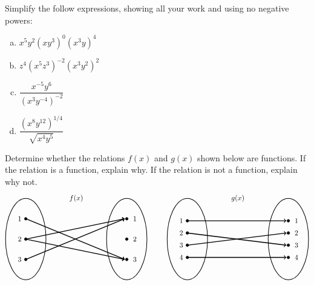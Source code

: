 \documentclass[11pt,letterpaper]{article}
\begin{document}
\prob Simplify the follow expressions, showing all your work and using no negative powers:
	\begin{enumerate}[(a)] \itemsep=0.3cm
	\item $x^5 y^2 (xy^3)^0 (x^3y)^4$
	\item $z^4(x^5 z^3)^{-2} (x^3 y^2)^2$
	\item $\dfrac{x^{-5} y^6}{(x^3 y^{-4})^{-2}}$
	\item $\dfrac{(x^8 y^{12})^{1/4}}{\sqrt{x^4 y^5}}$
	\end{enumerate} \pspace


\prob Determine whether the relations $f(x)$ and $g(x)$ shown below are functions. If the relation is a function, explain why. If the relation is not a function, explain why not. 
	\[
	\begin{tikzpicture}
	\node at (2.5,2) {$f(x)$};
	\draw[line width=0.03cm] (0,0) circle (1 and 2);
	\draw[line width=0.03cm] (5,0) circle (1 and 2);
	
	\draw[fill=black] (0,1) circle (0.07);
	\draw[fill=black] (0,0) circle (0.07);
	\draw[fill=black] (0,-1) circle (0.07);
	
	\draw[fill=black] (5,1) circle (0.07);
	\draw[fill=black] (5,0) circle (0.07);
	\draw[fill=black] (5,-1) circle (0.07);
	
	\draw[line width=0.04cm,->] (0,1) -- (4.9,-1);
	\draw[line width=0.04cm,->] (0,0) -- (4.9,1);
	\draw[line width=0.04cm,->] (0,0) -- (4.9,-1);
	\draw[line width=0.04cm,->] (0,-1) -- (4.9,1);
	
	\node at (-0.3,1) {$1$};
	\node at (-0.3,0) {$2$};
	\node at (-0.3,-1) {$3$};
	
	\node at (5.4,1) {$1$};
	\node at (5.4,0) {$2$};
	\node at (5.4,-1) {$3$};
	
	\tikzset{shift={(8,0)}}
	\node at (2.5,2) {$g(x)$};
	\draw[line width=0.03cm] (0,0) circle (1 and 2);
	\draw[line width=0.03cm] (5,0) circle (1 and 2);
	
	\draw[fill=black] (0,0.9) circle (0.07);
	\draw[fill=black] (0,0.3) circle (0.07);
	\draw[fill=black] (0,-0.3) circle (0.07);
	\draw[fill=black] (0,-0.9) circle (0.07);
	
	\draw[fill=black] (5,0.9) circle (0.07);
	\draw[fill=black] (5,0.3) circle (0.07);
	\draw[fill=black] (5,-0.3) circle (0.07);
	\draw[fill=black] (5,-0.9) circle (0.07);
	
	\draw[line width=0.04cm,->] (0,0.9) -- (4.9,0.9);
	\draw[line width=0.04cm,->] (0,0.3) -- (4.9,-0.3);
	\draw[line width=0.04cm,->] (0,-0.3) -- (4.9,0.3);
	\draw[line width=0.04cm,->] (0,-0.9) -- (4.9,-0.9);

	
	\node at (-0.3,0.9) {$1$};
	\node at (-0.3,0.3) {$2$};
	\node at (-0.3,-0.3) {$3$};
	\node at (-0.3,-0.9) {$4$};
	
	\node at (5.4,0.9) {$1$};
	\node at (5.4,0.3) {$2$};
	\node at (5.4,-0.3) {$3$};
	\node at (5.4,-0.9) {$4$};
	\end{tikzpicture}
	\] \pspace
\end{document}
